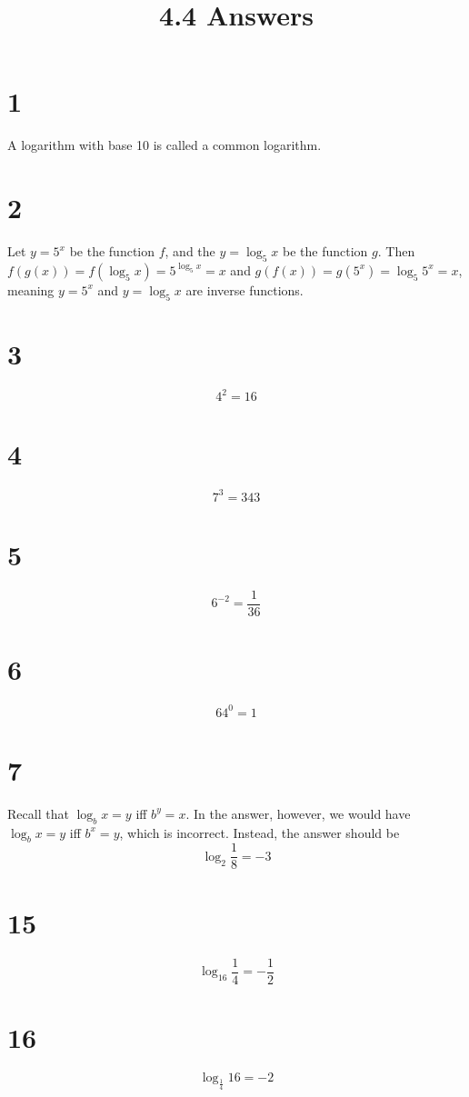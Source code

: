 \documentclass{article}
\title{4.4 Answers}
\theoremstyle{definition}
\newcommand{\?}{\stackrel{?}{=}}
\begin{document}
\maketitle

\section*{1}
A logarithm with base 10 is called a common logarithm.

\section*{2}
Let $y=5^x$ be the function $f$, and the $y=\log_5 x$ be the function $g$. Then $f(g(x))=f(\log_5 x)=5^{\log_5 x}=x$ and 
$g(f(x))=g(5^x)=\log_5{5^x}=x$, meaning $y=5^x$ and $y=\log_5 x$ are inverse functions.

\section*{3}
\[ 4^2=16 \]

\section*{4}
\[ 7^3=343 \]

\section*{5}
\[ 6^{-2}=\frac{1}{36} \]

\section*{6}
\[ 64^0=1 \]

\section*{7}
Recall that $\log_b x=y$ iff $b^y=x$. In the answer, however, we would have $\log_b x=y$ iff $b^x=y$, which is incorrect. Instead, the answer 
should be \[ \log_2 \frac{1}{8}=-3 \]

\section*{15}
\[ \log_{16}\frac{1}{4}=-\frac{1}{2} \]

\section*{16}
\[ \log_{\frac{1}{4}}16={-2} \]
\end{document}
